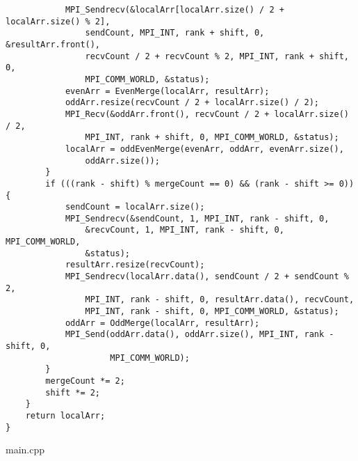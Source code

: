 \documentclass{report}
\begin{document}
\begin{lstlisting}
            MPI_Sendrecv(&localArr[localArr.size() / 2 + localArr.size() % 2],
                sendCount, MPI_INT, rank + shift, 0, &resultArr.front(),
                recvCount / 2 + recvCount % 2, MPI_INT, rank + shift, 0,
                MPI_COMM_WORLD, &status);
            evenArr = EvenMerge(localArr, resultArr);
            oddArr.resize(recvCount / 2 + localArr.size() / 2);
            MPI_Recv(&oddArr.front(), recvCount / 2 + localArr.size() / 2,
                MPI_INT, rank + shift, 0, MPI_COMM_WORLD, &status);
            localArr = oddEvenMerge(evenArr, oddArr, evenArr.size(),
                oddArr.size());
        }
        if (((rank - shift) % mergeCount == 0) && (rank - shift >= 0)) {
            sendCount = localArr.size();
            MPI_Sendrecv(&sendCount, 1, MPI_INT, rank - shift, 0,
                &recvCount, 1, MPI_INT, rank - shift, 0, MPI_COMM_WORLD,
                &status);
            resultArr.resize(recvCount);
            MPI_Sendrecv(localArr.data(), sendCount / 2 + sendCount % 2,
                MPI_INT, rank - shift, 0, resultArr.data(), recvCount,
                MPI_INT, rank - shift, 0, MPI_COMM_WORLD, &status);
            oddArr = OddMerge(localArr, resultArr);
            MPI_Send(oddArr.data(), oddArr.size(), MPI_INT, rank - shift, 0,
                     MPI_COMM_WORLD);
        }
        mergeCount *= 2;
        shift *= 2;
    }
    return localArr;
}

\end{lstlisting}
\par main.cpp
\end{document}

